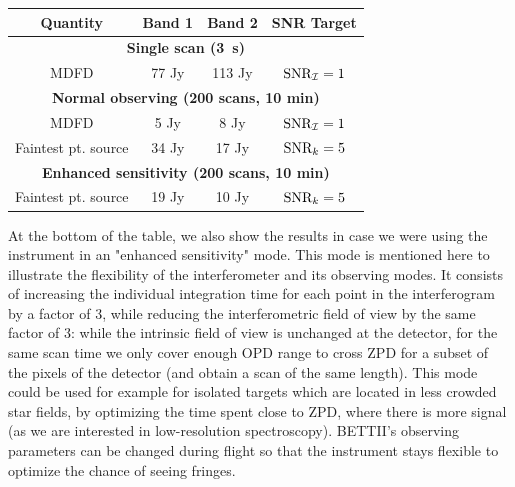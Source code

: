 \begin{table}[ht!]
\begin{center}
\caption{BETTII sensitivity estimates}
\label{tab:BETTIIsensitivity2}
\vspace{-0.5cm}
\begin{longtable}{cccc}
\toprule
  Quantity   & Band 1 &  Band 2 & SNR Target \\
     \midrule 
 \multicolumn{4}{c}{\textbf{Single scan (\SI{3}{\second})}} \\
MDFD & 77 Jy  & 113 Jy & $\textrm{SNR}_{\mathcal{I}} = 1$\\ 
\midrule
\multicolumn{4}{c}{\textbf{Normal observing (200 scans, 10 min)}} \\
MDFD & 5 Jy  & 8 Jy & $\textrm{SNR}_{\mathcal{I}} = 1$\\ 
Faintest pt. source & 34 Jy  & 17 Jy & $\textrm{SNR}_k = 5$\\ 
\midrule
\multicolumn{4}{c}{\textbf{Enhanced sensitivity (200 scans, 10 min)}} \\
\midrule
Faintest pt. source & 19 Jy  & 10 Jy & $\textrm{SNR}_k = 5$\\ 
\bottomrule 
\end{longtable} 
\label{tab:sensitivity}
\end{center}
\end{table} 


At the bottom of the table, we also show the results in case we were using the instrument in an "enhanced sensitivity" mode. This mode is mentioned here to illustrate the flexibility of the interferometer and its observing modes. It consists of increasing the individual integration time for each point in the interferogram by a factor of 3, while reducing the interferometric field of view by the same factor of 3: while the intrinsic field of view is unchanged at the detector, for the same scan time we only cover enough OPD range to cross ZPD for a subset of the pixels of the detector (and obtain a scan of the same length). This mode could be used for example for isolated targets which are located in less crowded star fields, by optimizing the time spent close to ZPD, where there is more signal (as we are interested in low-resolution spectroscopy). BETTII's observing parameters can be changed during flight so that the instrument stays flexible to optimize the chance of seeing fringes.

